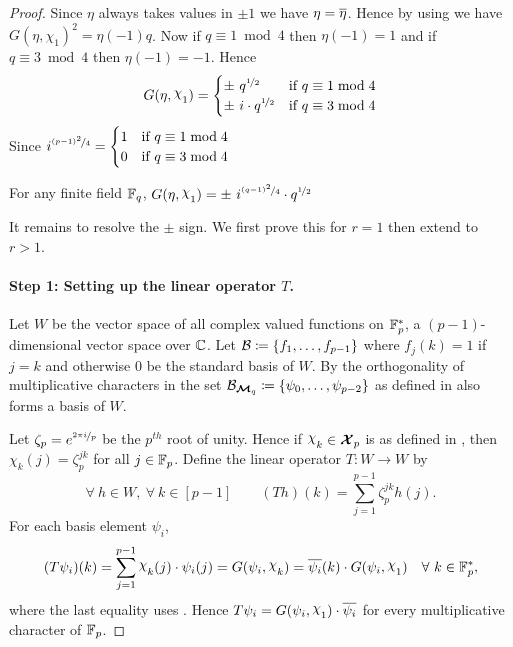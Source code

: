 \begin{proof}
  Since $\eta$ always takes values in $\pm 1$ we have $\eta=\overline{\eta}$. Hence by using  we have $G(\eta,\chi_1)^2=\eta(-1)q$. Now if $q\equiv 1\bmod 4$ then $\eta(-1)=1$ and if $q\equiv 3\bmod 4$ then $\eta(-1)=-1$. Hence \begin{equation}
    G(\eta,\chi_1)=\begin{cases}
      \pm\ q^{\nicefrac12}& \text{if }q\equiv 1\bmod 4\\
      \pm\ i\cdot q^{\nicefrac12}& \text{if }q\equiv 3\bmod 4
    \end{cases}
  \end{equation}
  Since $i^{\nicefrac{(p-1)^2}{4}}=\begin{cases}
      1 & \text{if }q\equiv 1\bmod 4\\ 0 & \text{if }q\equiv 3\bmod 4
    \end{cases}$

  \begin{observation}\label{obs:gauss-quad-char}
    For any finite field $\mathbb{F}_q$,  $G(\eta,\chi_1)=\pm\ i^{\nicefrac{(q-1)^2}{4}}\cdot q^{\nicefrac12}$
  \end{observation}

  It remains to resolve the $\pm$ sign. We first prove this for $r=1$ then extend to $r>1$.

  \paragraph*{Step 1: Setting up the linear operator $T$.}
  Let $W$ be the vector space of all complex valued functions on $\mathbb{F}_p^*$, a $(p-1)$-dimensional vector space over $\mathbb{C}$. Let $\mathcal{B}\coloneqq \{f_1,\dots, f_{p-1}\}$ where $f_j(k)=1$ if $j=k$ and otherwise $0$ be the standard basis of $W$. By the orthogonality of multiplicative characters in  the set $\mathcal{B}_{\boldsymbol{\mathcal{M}}_q}\coloneqq \{\psi_0,\dots, \psi_{p-2}\}$ as defined in  also forms a basis of $W$.

  Let $\zeta_p=e^{\nicefrac{2\pi i}{p}}$ be the $p^{th}$ root of unity. Hence if $\chi_k\in\Xp$ is as defined in , then $\chi_k(j)=\zeta_p^{jk}$ for all $j\in\mathbb{F}_p$. Define the linear operator $T:W\to W$ by
  \begin{equation}\label{eq:quad-linear-operator}
    \forall\ h\in W,\ \forall\ k\in[p-1]\qquad (Th)(k)=\sum_{j=1}^{p-1}\zeta_p^{jk}h(j).
  \end{equation}
  For each basis element $\psi_i$, $$(T\psi_i)(k)=\sum_{j=1}^{p-1}\chi_k(j)\cdot \psi_i(j)=G(\psi_i,\chi_k)=\ov{\psi_i}(k)\cdot G(\psi_i,\chi_1)\quad \forall\ k\in\bbF_p^*,$$where the last equality uses . Hence $T\psi_i=G(\psi_i,\chi_1)\cdot \ov{\psi_i}$ for every multiplicative character of $\mathbb{F}_p$.


\end{proof}
